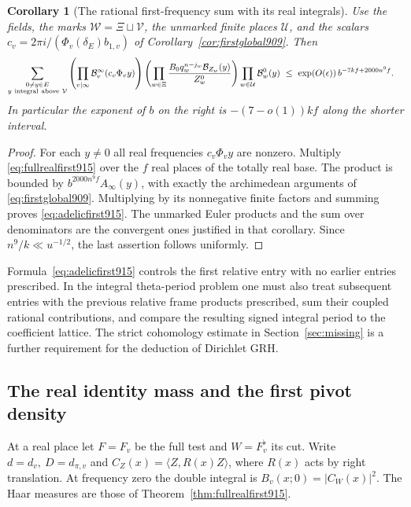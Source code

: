 \documentclass[a4paper,11pt]{article}
\newtheorem{corollary}[proposition]{Corollary}
\theoremstyle{definition}
\theoremstyle{remark}
\numberwithin{equation}{section}
\begin{document}
\begin{corollary}[The rational first-frequency sum with its real integrals]
\leavevmode\label{cor:adelicfirst915}
Use the fields, the marks \(\mathcal W=\Xi\sqcup\mathcal V\),
the unmarked finite places \(\mathcal U\), and the scalars
\(c_v=2\pi i/(\Phi_v(\delta_E)b_{1,v})\) of
Corollary~\ref{cor:firstglobal909}. Then
\begin{align}
 \sum_{\substack{0\ne y\in E\\ y\ {\rm integral\ above}\ \mathcal V}}
  &\left(\prod_{v\mid\infty}\mathcal B^\infty_v(c_v\Phi_v y)\right)
   \left(\prod_{w\in\Xi}
     \frac{B_0 q_w^{n-j_w}\mathcal B_{Z_w}(y)}{Z_w^0}\right)
   \prod_{w\in\mathcal U}\mathcal B_w^0(y)
   \ \le\ \exp(O(\epsilon))\,b^{-7kf+2000n^9 f}.
 \label{eq:adelicfirst915}
\end{align}
In particular the exponent of \(b\) on the right is
\(-(7-o(1))kf\) along the shorter interval.
\end{corollary}
\begin{proof}
For each \(y\ne0\) all real frequencies \(c_v\Phi_v y\)
are nonzero. Multiply \eqref{eq:fullrealfirst915} over the
\(f\) real places of the totally real base. The product is
bounded by \(b^{2000n^9f}A_\infty(y)\), with exactly the
archimedean arguments of \eqref{eq:firstglobal909}. Multiplying
by its nonnegative finite factors and summing proves
\eqref{eq:adelicfirst915}. The unmarked Euler products and the
sum over denominators are the convergent ones justified in
that corollary. Since \(n^9/k\ll u^{-1/2}\), the last
assertion follows uniformly.
\end{proof}

Formula~\eqref{eq:adelicfirst915} controls the first relative
entry with no earlier entries prescribed. In the integral
theta-period problem one must also treat subsequent entries
with the previous relative frame products prescribed, sum
their coupled rational contributions, and compare the resulting
signed integral period to the coefficient lattice. The
strict cohomology estimate in Section~\ref{sec:missing} is a
further requirement for the deduction of Dirichlet GRH.
\clearpage

\subsection{The real identity mass and the first pivot density}
\label{sec:realcutmass916}

At a real place let \(F=F_v\) be the full test and \(W=F_v^\flat\)
its cut. Write \(d=d_v,\ D=d_{\pi,v}\) and
\(C_Z(x)=\langle Z,R(x)Z\rangle\), where \(R(x)\) acts by
right translation. At frequency zero the double integral is
\(B_v(x;0)=|C_W(x)|^2\). The Haar measures are those of
Theorem~\ref{thm:fullrealfirst915}.
\end{document}
